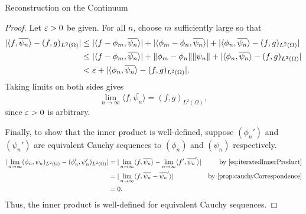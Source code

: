 \begin{chapter}{Reconstruction on the Continuum}
\begin{proof}
Let $\varepsilon > 0$ be given. 
For all $n$, choose $m$ sufficiently large so that
\begin{align}
  |\langle f,\overline{\psi_n}\rangle - (f,g)_{L^2(\Omega)}| 
    &\le |\langle f - \phi_m,\overline{\psi_n}\rangle| + |\langle \phi_m - \phi_n, \overline{\psi_n}\rangle| + |\langle \phi_n,\overline{\psi_n}\rangle - (f,g)_{L^2(\Omega)}| \nonumber\\
    &\le |\langle f - \phi_m,\overline{\psi_n}\rangle| + \| \phi_m - \phi_n\| \|\psi_n\| + |\langle \phi_n,\overline{\psi_n}\rangle - (f,g)_{L^2(\Omega)}| \nonumber\\
    &< \varepsilon +|\langle \phi_n,\overline{\psi_n}\rangle - (f,g)_{L^2(\Omega)}|.
\end{align}
Taking limits on both sides gives 
\begin{equation} \label{eq:iteratedInnerProduct}
  \lim_{n\to\infty} \langle f,\bar{\psi_n}\rangle = (f,g)_{L^2(\Omega)}, 
\end{equation}
since $\varepsilon>0$ is arbitrary.

Finally, to show that the inner product is well-defined, suppose $(\phi_n')$ and $(\psi_n')$ are equivalent Cauchy sequences to $(\phi_n)$ and $(\psi_n)$ respectively.
\begin{align}
  |\lim_{n\to\infty}(\phi_n,\psi_n)_{L^2(\Omega)} - (\phi_n',\psi_n')_{L^2(\Omega)}| 
  &= |\lim_{n\to\infty}\langle f,\bar{\psi_n}\rangle - \lim_{n\to\infty}\langle f',\bar{\psi_n}'\rangle| &\text{by \eqref{eq:iteratedInnerProduct}}\nonumber\\
  &= |\lim_{n\to\infty}\langle f,\bar{\psi_n} - \bar{\psi_n}'\rangle| &\text{by \Cref{prop:cauchyCorrespondence}}\nonumber \\
  &= 0 \nonumber.
\end{align}
Thus, the inner product is well-defined for equivalent Cauchy sequences.
\end{proof}


\end{chapter}
